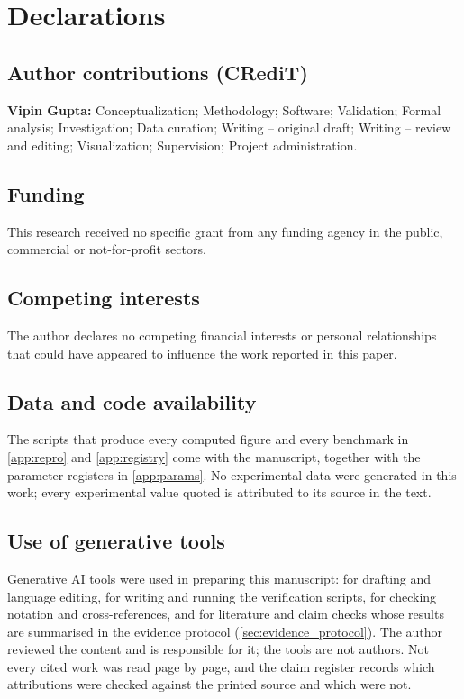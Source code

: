 \section*{Declarations}\label{sec:declarations}

\subsection*{Author contributions (CRediT)}
\textbf{Vipin Gupta:} Conceptualization; Methodology; Software; Validation; Formal analysis;
Investigation; Data curation; Writing -- original draft; Writing -- review and editing;
Visualization; Supervision; Project administration.

\subsection*{Funding}
This research received no specific grant from any funding agency in the public, commercial or
not-for-profit sectors.

\subsection*{Competing interests}
The author declares no competing financial interests or personal relationships that could have
appeared to influence the work reported in this paper.

\subsection*{Data and code availability}
The scripts that produce every computed figure and every benchmark in \cref{app:repro} and
\cref{app:registry} come with the manuscript, together with the parameter registers in
\cref{app:params}. No experimental data were generated in this work; every experimental value quoted is
attributed to its source in the text.

\subsection*{Use of generative tools}
Generative AI tools were used in preparing this manuscript: for drafting and language editing, for writing and running the verification scripts, for checking notation and cross-references, and for literature and claim checks whose results are summarised in the evidence protocol (\cref{sec:evidence_protocol}). The author reviewed the content and is responsible for it; the tools are not authors. Not every cited work was read page by page, and the claim register records which attributions were checked against the printed source and which were not.
